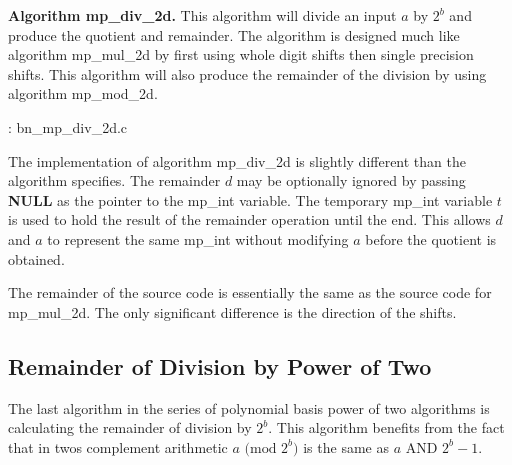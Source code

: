 \documentclass[b5paper]{book}
\begin{document}
\textbf{Algorithm mp\_div\_2d.}
This algorithm will divide an input $a$ by $2^b$ and produce the quotient and remainder.  The algorithm is designed much like algorithm 
mp\_mul\_2d by first using whole digit shifts then single precision shifts.  This algorithm will also produce the remainder of the division
by using algorithm mp\_mod\_2d.

\vspace{+3mm}\begin{small}
\hspace{-5.1mm}{\bf File}: bn\_mp\_div\_2d.c
\vspace{-3mm}
\begin{alltt}
\end{alltt}
\end{small}

The implementation of algorithm mp\_div\_2d is slightly different than the algorithm specifies.  The remainder $d$ may be optionally 
ignored by passing \textbf{NULL} as the pointer to the mp\_int variable.    The temporary mp\_int variable $t$ is used to hold the 
result of the remainder operation until the end.  This allows $d$ and $a$ to represent the same mp\_int without modifying $a$ before
the quotient is obtained.

The remainder of the source code is essentially the same as the source code for mp\_mul\_2d.  The only significant difference is
the direction of the shifts.

\subsection{Remainder of Division by Power of Two}

The last algorithm in the series of polynomial basis power of two algorithms is calculating the remainder of division by $2^b$.  This
algorithm benefits from the fact that in twos complement arithmetic $a \mbox{ (mod }2^b\mbox{)}$ is the same as $a$ AND $2^b - 1$.  
\end{document}

